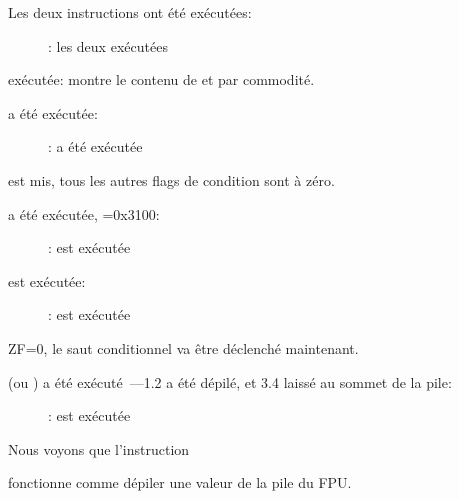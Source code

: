 ﻿\clearpage
{}
\myindex{\olly}

Les deux instructions \FLD ont été exécutées:

\begin{figure}[H]
\centering
{}
\caption{\olly: les deux \FLD exécutées}
\label{fig:FPU_comparison_Ox_case1_olly1}
\end{figure}

\FCOM exécutée:
\olly montre le contenu de  et  par commodité.

\clearpage
\FCOM a été exécutée:

\begin{figure}[H]
\centering
{}
\caption{\olly: \FCOM a été exécutée}
\label{fig:FPU_comparison_Ox_case1_olly2}
\end{figure}

\Czero est mis, tous les autres flags de condition sont à zéro.

\clearpage
\FNSTSW a été exécutée, =0x3100:

\begin{figure}[H]
\centering
{}
\caption{\olly: \FNSTSW est exécutée}
\label{fig:FPU_comparison_Ox_case1_olly3}
\end{figure}

\clearpage
\TEST est exécutée:

\begin{figure}[H]
\centering
{}
\caption{\olly: \TEST est exécutée}
\label{fig:FPU_comparison_Ox_case1_olly4}
\end{figure}

ZF=0, le saut conditionnel va être déclenché maintenant.

\clearpage
{} (ou \FSTP {}) a été exécuté~---1.2 a été dépilé, et 3.4 laissé
au sommet de la pile:

\begin{figure}[H]
\centering
{}
\caption{\olly: \FSTP est exécutée}
\label{fig:FPU_comparison_Ox_case1_olly5}
\end{figure}

Nous voyons que l'instruction 

fonctionne comme dépiler une valeur de la pile du FPU.

